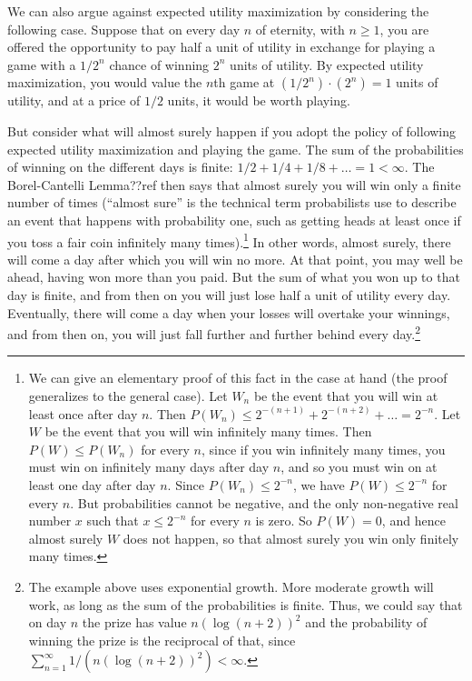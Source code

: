We can also argue against expected utility maximization by considering the following case. Suppose that on every day $n$ of
eternity, with $n\ge 1$, you are offered the opportunity to pay half a unit of utility in exchange for playing a game with a 
$1/2^n$ chance of winning $2^n$ units of utility. By expected utility maximization, you would value the $n$th game at
$(1/2^n)\cdot (2^n)=1$ units of utility, and at a price of $1/2$ units, it would be worth playing. 

But consider what will almost surely happen if you adopt the policy of following expected utility maximization and playing the game. The sum of the probabilities of winning on the different days is finite: 
$1/2+1/4+1/8+\dots=1<\infty$. The Borel-Cantelli Lemma??ref then says that almost surely you will win only a finite number of times
(``almost sure'' is the technical term probabilists use to describe an event that happens with probability one, such as 
getting heads at least once if you toss a fair coin infinitely many times).\footnote{We 
can give an elementary proof of this fact in the case at hand (the proof generalizes to the general case). Let $W_n$ be the event that you will win at least once after day $n$. 
Then $P(W_n)\le 2^{-(n+1)}+2^{-(n+2)}+\dots = 2^{-n}$. Let $W$ be the event that you will win infinitely many times. Then $P(W)\le P(W_n)$ for
every $n$, since if you win infinitely many times, you must win on infinitely many days after day $n$, and so you must win on at least one
day after day $n$. Since $P(W_n) \le 2^{-n}$, we have $P(W) \le 2^{-n}$ for every $n$. But probabilities cannot be negative, and the only 
non-negative real number $x$ such that $x \le 2^{-n}$ for every $n$ is zero. So $P(W)=0$, and hence almost surely $W$ does not happen,
so that almost surely you win only finitely many times.} In other words, almost surely, there will come a day after which you will win no more. At that point, you may well be ahead,
having won more than you paid. But the sum of what you won up to that day is finite, and from then on you will just lose half a unit of utility every 
day. Eventually, there will come a day when your losses will overtake your winnings, and from then on, you will just fall further and further
behind every day.\footnote{The example above uses exponential growth. More moderate growth will work, as long as the sum of the probabilities
is finite. Thus, we could say that on day $n$ the prize has value $n (\log (n+2))^2$ and the probability of winning the prize is the reciprocal
of that, since $\sum_{n=1}^\infty 1/(n (\log (n+2))^2)<\infty$.}

